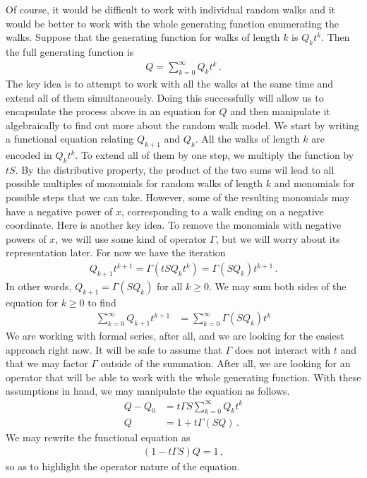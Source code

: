 Of course, it would be difficult to work with individual random walks and it would be better to work with the whole generating function enumerating the walks. Suppose that the generating function for walks of length $k$ is $Q_kt^k$. Then the full generating function is
\begin{align}
	Q = \sum_{k=0}^\infty Q_k t^k\,.
\end{align}
The key idea is to attempt to work with all the walks at the same time and extend all of them simultaneously. Doing this successfully will allow us to encapsulate the process above in an equation for $Q$ and then manipulate it algebraically to find out more about the random walk model. We start by writing a functional equation relating $Q_{k+1}$ and $Q_k$. All the walks of length $k$ are encoded in $Q_kt^k$. To extend all of them by one step, we multiply the function by $tS$. By the distributive property, the product of the two sums wil lead to all possible multiples of monomials for random walks of length $k$ and monomials for possible steps that we can take. However, some of the resulting monomials may have a negative power of $x$, corresponding to a walk ending on a negative coordinate. Here is another key idea. To remove the monomials with negative powers of $x$, we will use some kind of operator $\Gamma$, but we will worry about its representation later. For now we have the iteration
\begin{align}
	Q_{k+1}t^{k+1} = \Gamma (tS Q_k t^k) = \Gamma(SQ_k)t^{k+1}\,.
\end{align}
In other words, $Q_{k+1} = \Gamma (SQ_k)$ for all $k\ge 0$. We may sum both sides of the equation for $k\ge 0$ to find
\begin{align}
	\sum_{k=0}^\infty Q_{k+1}t^{k+1} &= \sum_{k=0}^\infty\Gamma (SQ_k)t^k
\end{align}
We are working with formal series, after all, and we are looking for the easiest approach right now. It will be safe to assume that $\Gamma$ does not interact with $t$ and that we may factor $\Gamma$ outside of the summation. After all, we are looking for an operator that will be able to work with the whole generating function. With these assumptions in hand, we may manipulate the equation as follows.
\begin{align}
Q - Q_0 &= t\Gamma  S\sum_{k=0}^\infty Q_kt^k\\
	Q &= 1 + t\Gamma (SQ)\,.
\end{align}
We may rewrite the functional equation as
\begin{align}
	(1-t\Gamma S)Q = 1\,,
\end{align}
so as to highlight the operator nature of the equation. 

